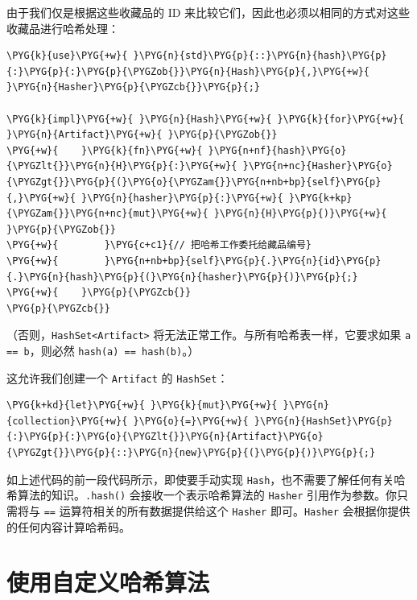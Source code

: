 由于我们仅是根据这些收藏品的 ID 来比较它们，因此也必须以相同的方式对这些收藏品进行哈希处理：

\begin{Verbatim}[commandchars=\\\{\},breaklines=true,breakanywhere=true,fontsize=\codefont,xleftmargin=17bp]
\PYG{k}{use}\PYG{+w}{ }\PYG{n}{std}\PYG{p}{::}\PYG{n}{hash}\PYG{p}{:}\PYG{p}{:}\PYG{p}{\PYGZob{}}\PYG{n}{Hash}\PYG{p}{,}\PYG{+w}{ }\PYG{n}{Hasher}\PYG{p}{\PYGZcb{}}\PYG{p}{;}

\PYG{k}{impl}\PYG{+w}{ }\PYG{n}{Hash}\PYG{+w}{ }\PYG{k}{for}\PYG{+w}{ }\PYG{n}{Artifact}\PYG{+w}{ }\PYG{p}{\PYGZob{}}
\PYG{+w}{    }\PYG{k}{fn}\PYG{+w}{ }\PYG{n+nf}{hash}\PYG{o}{\PYGZlt{}}\PYG{n}{H}\PYG{p}{:}\PYG{+w}{ }\PYG{n+nc}{Hasher}\PYG{o}{\PYGZgt{}}\PYG{p}{(}\PYG{o}{\PYGZam{}}\PYG{n+nb+bp}{self}\PYG{p}{,}\PYG{+w}{ }\PYG{n}{hasher}\PYG{p}{:}\PYG{+w}{ }\PYG{k+kp}{\PYGZam{}}\PYG{n+nc}{mut}\PYG{+w}{ }\PYG{n}{H}\PYG{p}{)}\PYG{+w}{ }\PYG{p}{\PYGZob{}}
\PYG{+w}{        }\PYG{c+c1}{// 把哈希工作委托给藏品编号}
\PYG{+w}{        }\PYG{n+nb+bp}{self}\PYG{p}{.}\PYG{n}{id}\PYG{p}{.}\PYG{n}{hash}\PYG{p}{(}\PYG{n}{hasher}\PYG{p}{)}\PYG{p}{;}
\PYG{+w}{    }\PYG{p}{\PYGZcb{}}
\PYG{p}{\PYGZcb{}}
\end{Verbatim}

（否则，\texttt{HashSet<Artifact>} 将无法正常工作。与所有哈希表一样，它要求如果 \texttt{a == b}，则必然 \texttt{hash(a) == hash(b)}。）

这允许我们创建一个 \texttt{Artifact} 的 \texttt{HashSet}：

\begin{Verbatim}[commandchars=\\\{\},breaklines=true,breakanywhere=true,fontsize=\codefont,xleftmargin=17bp]
\PYG{k+kd}{let}\PYG{+w}{ }\PYG{k}{mut}\PYG{+w}{ }\PYG{n}{collection}\PYG{+w}{ }\PYG{o}{=}\PYG{+w}{ }\PYG{n}{HashSet}\PYG{p}{:}\PYG{p}{:}\PYG{o}{\PYGZlt{}}\PYG{n}{Artifact}\PYG{o}{\PYGZgt{}}\PYG{p}{::}\PYG{n}{new}\PYG{p}{(}\PYG{p}{)}\PYG{p}{;}
\end{Verbatim}

如上述代码的前一段代码所示，即使要手动实现 \texttt{Hash}，也不需要了解任何有关哈希算法的知识。\texttt{.hash()} 会接收一个表示哈希算法的 \texttt{Hasher} 引用作为参数。你只需将与 \texttt{==} 运算符相关的所有数据提供给这个 \texttt{Hasher} 即可。\texttt{Hasher} 会根据你提供的任何内容计算哈希码。

\section{使用自定义哈希算法}

